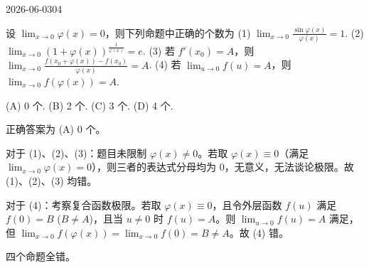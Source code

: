 \begin{mistake}{2026-06-03}{04}

\begin{problemcontent}
设 \(\lim_{x \to 0} \varphi(x) = 0\)，则下列命题中正确的个数为
(1) \(\lim_{x \to 0} \frac{\sin \varphi(x)}{\varphi(x)} = 1\).
(2) \(\lim_{x \to 0} (1 + \varphi(x))^{\frac{1}{\varphi(x)}} = e\).
(3) 若 \(f'(x_0) = A\)，则 \(\lim_{x \to 0} \frac{f(x_0 + \varphi(x)) - f(x_0)}{\varphi(x)} = A\).
(4) 若 \(\lim_{u \to 0} f(u) = A\)，则 \(\lim_{x \to 0} f(\varphi(x)) = A\).

(A) 0 个. (B) 2 个. (C) 3 个. (D) 4 个.
\end{problemcontent}

\begin{solutioncontent}
正确答案为 (A) 0 个。

对于 (1)、(2)、(3)：题目未限制 \(\varphi(x) \neq 0\)。若取 \(\varphi(x) \equiv 0\)（满足 \(\lim_{x \to 0} \varphi(x) = 0\)），则三者的表达式分母均为 0，无意义，无法谈论极限。故 (1)、(2)、(3) 均错。

对于 (4)：考察复合函数极限。若取 \(\varphi(x) \equiv 0\)，且令外层函数 \(f(u)\) 满足 \(f(0) = B\) (\(B \neq A\))，且当 \(u \neq 0\) 时 \(f(u) = A\)。则 \(\lim_{u \to 0} f(u) = A\) 满足，但 \(\lim_{x \to 0} f(\varphi(x)) = \lim_{x \to 0} f(0) = B \neq A\)。故 (4) 错。

四个命题全错。
\end{solutioncontent}


\end{mistake}
